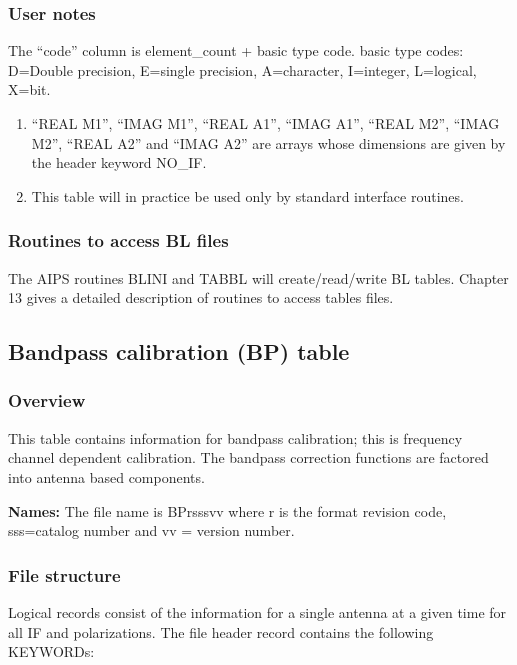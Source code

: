 \subsubsection{User notes}
  The ``code'' column is element\_count + basic type code.
basic type codes: D=Double precision, E=single precision, A=character,
I=integer, L=logical, X=bit.
\begin{enumerate}
\item  ``REAL M1'', ``IMAG M1'', ``REAL A1'', ``IMAG A1'',
``REAL M2'', ``IMAG M2'', ``REAL A2'' and ``IMAG A2'' are arrays whose
dimensions are given by the header keyword NO\_IF.
\item This table will in practice be used only by standard interface
routines.
\end{enumerate}

\subsubsection{Routines to access BL files}
     The AIPS routines BLINI and TABBL will
create/read/write BL tables.  Chapter 13 gives a detailed description
of routines to access tables files.


\subsection{Bandpass calibration (BP) table}
\subsubsection{Overview}
 
   This table contains  information for bandpass calibration; this is
frequency channel dependent calibration.  The bandpass correction
functions are factored into antenna based components.
 
{\bf Names:} The file name is BPrsssvv where r is the format revision
code, sss=catalog number and vv = version number.
 
\subsubsection{File structure}

    Logical records consist of the information for a single antenna at
a given time for all IF and polarizations.  The file header record
contains the following KEYWORDs:

